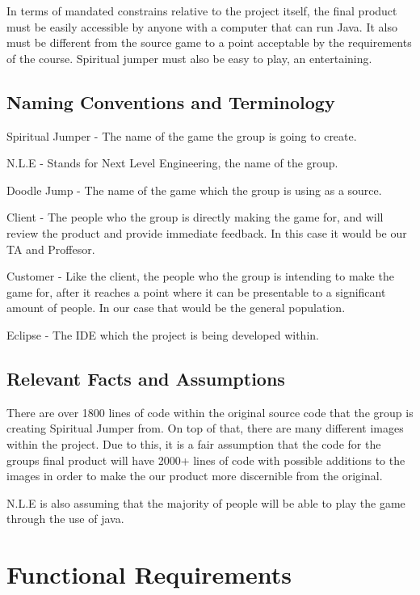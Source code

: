 \documentclass[12pt, titlepage]{article}
\newcommand{\rev}[1]{\textcolor{RevisionColour}{#1}}
\begin{document}
In terms of mandated constrains relative to the project itself, the final product must be easily accessible by anyone with a computer that can run Java. It also must be different from the source game to a point acceptable by the requirements of the course. Spiritual jumper must also be easy to play, an entertaining.

\subsection{Naming Conventions and Terminology}

Spiritual Jumper - The name of the game the group is going to create.

N.L.E - Stands for Next Level Engineering, the name of the group.

Doodle Jump - The name of the game which the group is using as a source.

Client - The people who the group is directly making the game for, and will review the product and provide immediate feedback. In this case it would be our TA and Proffesor. 

Customer - Like the client, the people who the group is intending to make the game for, after it reaches a point where it can be presentable to a significant amount of people. In our case that would be the general population.

\rev{Eclipse - The IDE which the project is being developed within.}

\rev{}

\subsection{Relevant Facts and Assumptions}

There are over 1800 lines of code within the original source code that the group is creating Spiritual Jumper from. On top of that, there are many different images within the project. Due to this, it is a fair assumption that the code for the groups final product will have 2000+ lines of code with possible additions to the images in order to make the our product more discernible from the original. 

N.L.E is also assuming that the majority of people will be able to play the game through the use of java.

\section{Functional Requirements}
\end{document}
